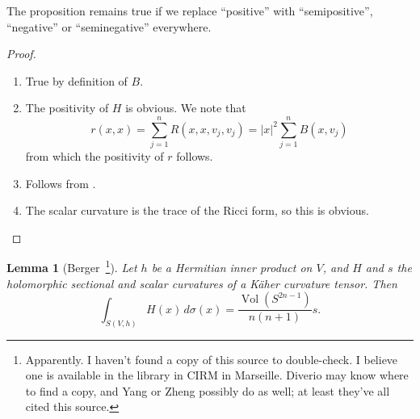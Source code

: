 \documentclass[11pt]{article}
\newtheorem{lemm}[theo]{Lemma}
\newtheorem*{proof}{Proof}
\DeclareMathOperator{\Vol}{Vol}
\begin{document}
The proposition remains true if we replace ``positive'' with ``semipositive'', ``negative'' or ``seminegative'' everywhere.

\begin{proof}
  \begin{enumerate}
  \item True by definition of $B$.
  \item The positivity of $H$ is obvious. We note that
    $$
    r(x,x) = \sum_{j=1}^n R(x,x,v_j,v_j) = |x|^2 \sum_{j=1}^n B(x,v_j)
    $$
    from which the positivity of $r$ follows.
  \item Follows from .
  \item The scalar curvature is the trace of the Ricci form, so this is obvious.
  \end{enumerate}
\end{proof}


\begin{lemm}[Berger~\cite{berger1965varietes}\footnote{Apparently. I haven't found a copy of this source to double-check. I believe one is available in the library in CIRM in Marseille.  Diverio may know where to find a copy, and Yang or Zheng possibly do as well; at least they've all cited this source.}]
\label{lemm:holomorphic-sectional-to-scalar}
Let $h$ be a Hermitian inner product on $V$, and $H$ and $s$ the holomorphic sectional and scalar curvatures of a K\"aher curvature tensor. Then
$$
\int_{S(V,h)} H(x) \, d\sigma(x) = \frac{\Vol(S^{2n-1})}{n(n+1)} s.
$$
\end{lemm}
\end{document}
